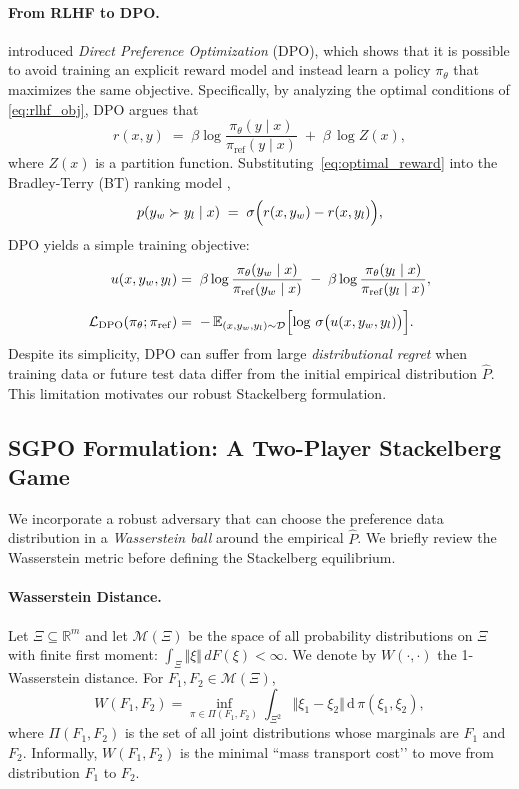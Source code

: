 \paragraph{From RLHF to DPO.}  
\citet{Rafailov2023DirectPreference} introduced \emph{Direct Preference Optimization} (DPO), which shows that it is possible to avoid training an explicit reward model and instead learn a policy \(\pi_\theta\) that maximizes the same objective.  Specifically, by analyzing the optimal conditions of \eqref{eq:rlhf_obj}, DPO argues that
\begin{equation}
\label{eq:optimal_reward}
    r(x,y) \;=\; \beta \log\frac{\pi_\theta(y\mid x)}{\pi_{\mathrm{ref}}(y\mid x)} \;+\; \beta\,\log Z(x),
\end{equation}
where \(Z(x)\) is a partition function.  Substituting~\eqref{eq:optimal_reward} into the Bradley-Terry (BT) ranking model \citep{Bradley1952RankAnalysis},
\[
p(y_w \succ y_l \mid x) \;=\; \sigma \Bigl(r(x,y_w) - r(x,y_l)\Bigr),
\]
DPO yields a simple training objective:
\begin{equation}
\label{eq:dpo_loss}
\begin{split}
u(x,y_w,y_l)
&=\; \beta\log\frac{\pi_\theta(y_w\mid x)}{\pi_{\mathrm{ref}}(y_w\mid x)}
\;-\; \beta\log\frac{\pi_\theta(y_l\mid x)}{\pi_{\mathrm{ref}}(y_l\mid x)}, 
\\[6pt]
\mathcal{L}_{\mathrm{DPO}}(\pi_{\theta};\pi_{\mathrm{ref}})
&=\; -\,\mathbb{E}_{(x,y_{w},y_{l}) \sim \mathcal{D}}
\Bigl[\log\,\sigma\bigl(u(x,y_{w},y_{l})\bigr)\Bigr].
\end{split}
\end{equation}
Despite its simplicity, DPO can suffer from large \emph{distributional regret} when training data or future test data differ from the initial empirical distribution \(\hat{P}\).  This limitation motivates our robust Stackelberg formulation.

\subsection{SGPO Formulation: A Two-Player Stackelberg Game}

We incorporate a robust adversary that can choose the preference data distribution in a \emph{Wasserstein ball} around the empirical \(\hat{P}\).  We briefly review the Wasserstein metric before defining the Stackelberg equilibrium.

\paragraph{Wasserstein Distance.}
Let \(\Xi \subseteq \mathbb{R}^m\) and let \(\mathcal{M}(\Xi)\) be the space of all probability distributions on \(\Xi\) with finite first moment:
\(\int_{\Xi}\Vert \xi\Vert \, dF(\xi)<\infty.\)
We denote by \(W(\cdot,\cdot)\) the 1-Wasserstein distance.  For \(F_1,F_2\in \mathcal{M}(\Xi)\),
\[
    W(F_1, F_2)
    = \inf_{\pi \in \Pi(F_1, F_2)} 
    \int_{\Xi^2} \Vert \xi_1 - \xi_2 \Vert \, \mathrm{d}\,\pi(\xi_1,\xi_2),
\]
where \(\Pi(F_1, F_2)\) is the set of all joint distributions whose marginals are \(F_1\) and \(F_2\).  Informally, \(W(F_1,F_2)\) is the minimal ``mass transport cost’’ to move from distribution \(F_1\) to \(F_2\).

